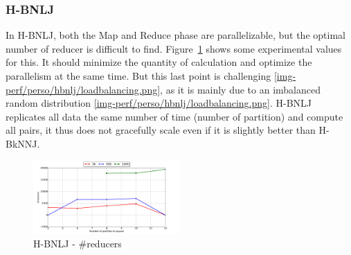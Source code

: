 \subsubsection{H-BNLJ}
In H-BNLJ, both the Map and Reduce phase are parallelizable, but the optimal number of reducer is difficult to find. Figure~\ref{fig:hbnlj_reducer} shows some experimental values for this. It should minimize the quantity of calculation and optimize the parallelism at the same time. But this last point is challenging \ref{img-perf/perso/hbnlj/loadbalancing.png},
as it is mainly due to an imbalanced random distribution \ref{img-perf/perso/hbnlj/loadbalancing.png}.
H-BNLJ replicates all data the same number of time (number of partition) and compute all pairs, it thus does not gracefully scale even if it is slightly better than H-BkNNJ.
\begin{figure}[!h]
\centering
                \includegraphics[width=0.5\textwidth]{img-perf/perso/hbnlj/reducer.pdf}
                \caption{H-BNLJ - \#reducers}
                \label{fig:hbnlj_reducer}
\end{figure}


